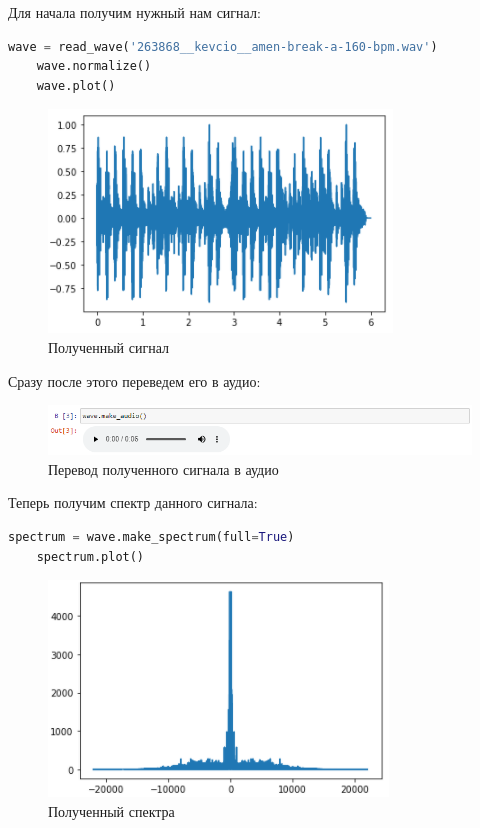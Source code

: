 \documentclass[a4paper]{article}
\begin{document}
            Для начала получим нужный нам сигнал:
            
\begin{lstlisting}[language=Python, caption= Получение сигнала]
    wave = read_wave('263868__kevcio__amen-break-a-160-bpm.wav')
    wave.normalize()
    wave.plot()
\end{lstlisting}
            
            \begin{figure}[H]
                \centering
                \includegraphics{ex_3_1.png}
                \caption{Полученный сигнал}
                \label{fig:ex_3_1}
            \end{figure}
            
            Сразу после этого переведем его в аудио:
            
            \begin{figure}[H]
                \centering
                \includegraphics[width=\textwidth]{ex_3_2.png}
                \caption{Перевод полученного сигнала в аудио}
                \label{fig:ex_3_2}
            \end{figure}

            Теперь получим спектр данного сигнала:
            
\begin{lstlisting}[language=Python, caption= Получение спектра]
    spectrum = wave.make_spectrum(full=True)
    spectrum.plot()
\end{lstlisting}
            
            \begin{figure}[H]
                \centering
                \includegraphics{ex_3_3.png}
                \caption{Полученный спектра}
                \label{fig:ex_3_3}
            \end{figure}
            
\end{document}
